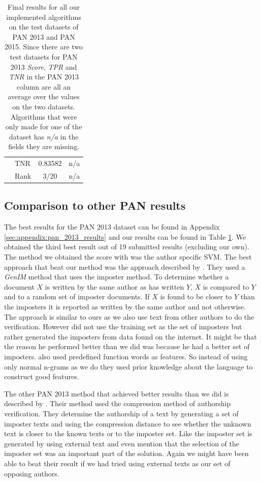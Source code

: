 \begin{table}
\begin{tabular}{ll|cc}
                                  & \gls{TNR} & 0.83582           & n/a               \\
                                  & Rank      & 3/20              & n/a
    \end{tabular}
    \caption{Final results for all our implemented algorithms on the test
        datasets of PAN 2013 and PAN 2015. Since there are two test datasets for
        PAN 2013 \textit{Score}, \textit{\gls{TPR}} and \textit{\gls{TNR}} in
        the PAN 2013 column are all an average over the values on the two
        datasets. Algorithms that were only made for one of the dataset has
        \textit{n/a} in the fields they are missing.}
    \label{tab:all_final_results}
\end{table}

\subsection{Comparison to other PAN results}
The best results for the PAN 2013 dataset can be found in Appendix
\ref{sec:appendix:pan_2013_results} and our results can be found in Table
\ref{tab:all_final_results}. We obtained the third best
result out of 19 submitted results (excluding our own). The method we obtained
the score with was the author specific SVM. The best approach that beat
our method was the approach described by \cite{seidman:2013}. They used a
\textit{GenIM} method that uses the imposter method. To determine whether a
document $X$ is written by the same author as has written $Y$, $X$ is compared
to $Y$ and to a random set of imposter documents. If $X$ is found to be closer
to $Y$ than the imposters it is reported as written by the same author and
not otherwise. The approach is similar to ours as we also use text from other
authors to do the verification. However \cite{seidman:2013} did not use the
training set as the set of imposters but rather generated the imposters from
data found on the internet. It might be that the reason he performed better than
we did was because he had a better set of imposters. \cite{seidman:2013} also
used predefined function words as features. So instead of using only normal
n-grams as we do they used prior knowledge about the language to construct good
features.

The other PAN 2013 method that achieved better results than we did is 
described by \cite{veenman:2013}. Their method used the compression method of
authorship verification. They determine the authorship of a text by generating
a set of imposter texts and using the compression distance to see whether
the unknown text is closer to the known texts or to the imposter set. Like
\cite{seidman:2013} the imposter set is generated by using external text and
\cite{veenman:2013} even mention that the selection of the imposter set was 
an important part of the solution. Again we might have been able to beat their
result if we had tried using external texts as our set of opposing authors.

